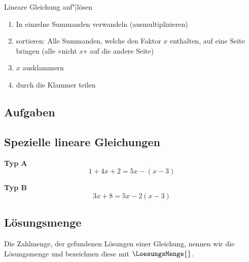 \begin{rezept}{Lineare Gleichung auf"|lösen}{}
  \begin{enumerate}
    \item In einzelne Summanden verwandeln (ausmultiplizieren)
  \item sortieren: Alle Summanden, welche den Faktor $x$ enthalten, auf eine Seite bringen (alle «nicht $x$» auf die andere Seite)
  \item $x$ ausklammern
  \item durch die Klammer teilen
    \end{enumerate} 
  \end{rezept}


\subsection*{Aufgaben}




\newpage

\subsection{Spezielle lineare Gleichungen}
\textbf{Typ A}\\

$$1+4x+2 = 5x - (x-3)$$

\textbf{Typ B}\\

$$3x+8 = 5x-2(x-3)$$


\subsection{Lösungsmenge}
  Die Zahlmenge, der gefundenen Lösungen einer Gleichung, nennen wir
  die Lösungsmenge und bezeichnen diese mit $\LoesungsMenge{}$.

